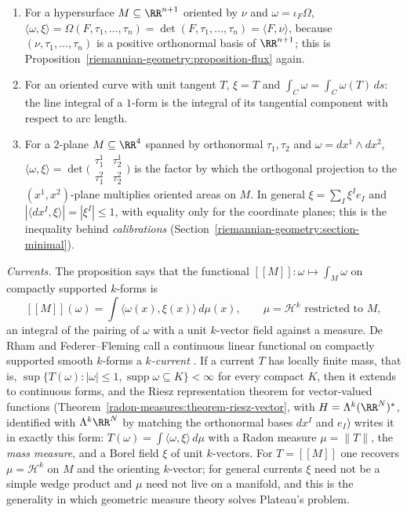 \begin{example}\label{riemannian-geometry:example-orienting-vector}
\begin{enumerate}
\item For a hypersurface $M \subseteq \RR^{n+1}$ oriented by $\nu$ and $\omega = \iota_F\Omega$, $\langle\omega, \xi\rangle = \Omega(F, \tau_1, \ldots, \tau_n) = \det(F, \tau_1, \ldots, \tau_n) = \langle F, \nu\rangle$, because
$(\nu, \tau_1, \ldots, \tau_n)$ is a positive orthonormal basis of $\RR^{n+1}$; this is Proposition~\ref{riemannian-geometry:proposition-flux} again.
\item For an oriented curve with unit tangent $T$, $\xi = T$ and $\int_C\omega = \int_C\omega(T)\,ds$: the line integral of a $1$-form is the integral of its tangential component with respect to arc length.
\item For a $2$-plane $M \subseteq \RR^4$ spanned by orthonormal $\tau_1, \tau_2$ and $\omega = dx^1 \wedge dx^2$, $\langle\omega, \xi\rangle = \det\bigl(\begin{smallmatrix} \tau_1^1 & \tau_2^1\\ \tau_1^2 & \tau_2^2\end{smallmatrix}\bigr)$ is the factor by
which the orthogonal projection to the $(x^1, x^2)$-plane multiplies oriented areas on $M$. In general $\xi = \sum_I\xi^Ie_I$ and $|\langle dx^I, \xi\rangle| = |\xi^I| \leq 1$, with equality only for the
coordinate planes; this is the inequality behind \emph{calibrations} (Section~\ref{riemannian-geometry:section-minimal}).
\end{enumerate}
\end{example}

\begin{remark}\label{riemannian-geometry:remark-currents}
\emph{Currents.} The proposition says that the functional $[\![M]\!] \colon \omega \mapsto \int_M\omega$ on compactly supported $k$-forms is
\[
[\![M]\!](\omega) = \int\langle\omega(x), \xi(x)\rangle\,d\mu(x), \qquad \mu = \mathcal{H}^k \text{ restricted to } M,
\]
an integral of the pairing of $\omega$ with a unit $k$-vector field against a measure. De Rham and Federer--Fleming call a continuous linear functional on compactly supported smooth $k$-forms a
\emph{$k$-current} \cite{federer-fleming-1960}. If a current $T$ has locally finite mass, that is, $\sup\{T(\omega) : |\omega| \leq 1, \operatorname{supp}\omega \subseteq K\} < \infty$ for every compact $K$, then it
extends to continuous forms, and the Riesz representation theorem for vector-valued functions (Theorem~\ref{radon-measures:theorem-riesz-vector}, with $H = \Lambda^k(\RR^N)^*$, identified with $\Lambda^k\RR^N$ by matching the orthonormal bases $dx^I$ and $e_I$)
writes it in exactly this form: $T(\omega) = \int\langle\omega, \xi\rangle\,d\mu$ with a Radon measure $\mu = \|T\|$, the \emph{mass measure}, and a Borel field $\xi$ of unit $k$-vectors. For $T = [\![M]\!]$ one recovers
$\mu = \mathcal{H}^k$ on $M$ and the orienting $k$-vector; for general currents $\xi$ need not be a simple wedge product and $\mu$ need not live on a manifold, and this is the generality in which geometric measure
theory solves Plateau's problem.
\end{remark}


